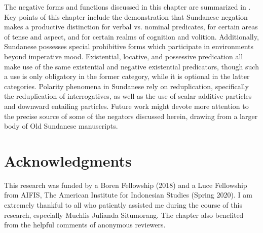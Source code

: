 \documentclass[output=paper]{langscibook}
\begin{document}
The negative forms and functions discussed in this chapter are summarized in .
Key points of this chapter include the demonstration that Sundanese negation makes a productive distinction for verbal vs. nominal predicates, for certain areas of tense and aspect, and for certain realms of cognition and volition. Additionally, Sundanese possesses special prohibitive forms which participate in environments beyond imperative mood. Existential, locative, and possessive predication all make use of the same existential and negative existential predicators, though such a use is only obligatory in the former category, while it is optional in the latter categories. Polarity phenomena in Sundanese rely on reduplication, specifically the reduplication of interrogatives, as well as the use of scalar additive particles and downward entailing particles. Future work might devote more attention to the precise source of some of the negators discussed herein, drawing from a larger body of Old Sundanese manuscripts. 

\section*{Acknowledgments}
This research was funded by a Boren Fellowship (2018) and a Luce Fellowship from AIFIS, The American Institute for Indonesian Studies (Spring 2020). I am extremely thankful to all who patiently assisted me during the course of this research, especially Muchlis Julianda Situmorang. The chapter also benefited from the helpful comments of anonymous reviewers.
\end{document}
